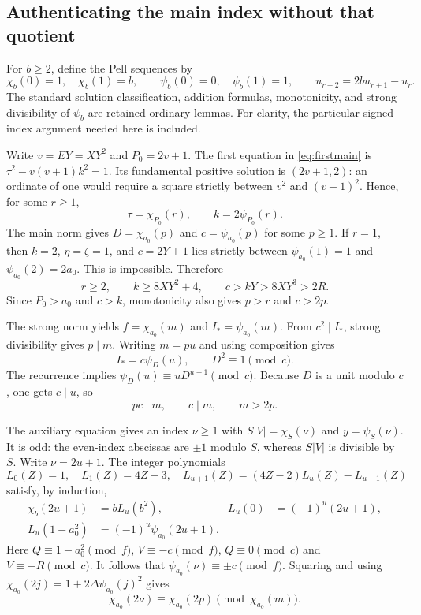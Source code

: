 \documentclass[11pt]{article}
\theoremstyle{remark}\newtheorem{remark}[theorem]{Remark}
\begin{document}
\subsection{Authenticating the main index without that quotient}

For $b\ge2$, define the Pell sequences by
\[
 \chi_b(0)=1,\quad\chi_b(1)=b,\qquad
 \psi_b(0)=0,\quad\psi_b(1)=1,
 \qquad u_{r+2}=2bu_{r+1}-u_r.
\]
The standard solution classification, addition formulas, monotonicity,
and strong divisibility of $\psi_b$ are retained ordinary lemmas.
For clarity, the particular signed-index argument needed here is included.

Write $v=EY=XY^2$ and $P_0=2v+1$. The first equation in
\eqref{eq:firstmain} is $\tau^2-v(v+1)k^2=1$. Its fundamental
positive solution is $(2v+1,2)$: an ordinate of one would require a
square strictly between $v^2$ and $(v+1)^2$. Hence, for some $r\ge1$,
\[
 \tau=\chi_{P_0}(r),\qquad k=2\psi_{P_0}(r).
\]
The main norm gives $D=\chi_{a_0}(p)$ and $c=\psi_{a_0}(p)$ for
some $p\ge1$. If $r=1$, then $k=2$, $\eta=\zeta=1$, and
$c=2Y+1$ lies strictly between $\psi_{a_0}(1)=1$ and
$\psi_{a_0}(2)=2a_0$. This is impossible. Therefore
\begin{equation}\label{eq:largec}
 r\ge2,\qquad k\ge8XY^2+4,\qquad c>kY>8XY^3>2R.
\end{equation}
Since $P_0>a_0$ and $c>k$, monotonicity also gives $p>r$ and $c>2p$.

The strong norm yields $f=\chi_{a_0}(m)$ and $I_*=\psi_{a_0}(m)$.
From $c^2\mid I_*$, strong divisibility gives $p\mid m$. Writing $m=pu$
and using composition gives
\[
 I_*=c\psi_D(u),\qquad D^2\equiv1\pmod c.
\]
The recurrence implies $\psi_D(u)\equiv uD^{u-1}\pmod c$.
Because $D$ is a unit modulo $c$, one gets $c\mid u$, so
\begin{equation}\label{eq:rank}
 pc\mid m,\qquad c\mid m,\qquad m>2p.
\end{equation}

The auxiliary equation gives an index $\nu\ge1$ with
$S|V|=\chi_S(\nu)$ and $y=\psi_S(\nu)$. It is odd: the even-index
abscissas are $\pm1$ modulo $S$, whereas $S|V|$ is divisible by $S$.
Write $\nu=2u+1$. The integer polynomials
\[
 L_0(Z)=1,\quad L_1(Z)=4Z-3,\quad
 L_{u+1}(Z)=(4Z-2)L_u(Z)-L_{u-1}(Z)
\]
satisfy, by induction,
\begin{align*}
 \chi_b(2u+1)&=bL_u(b^2),&L_u(0)&=(-1)^u(2u+1),\\
 L_u(1-a_0^2)&=(-1)^u\psi_{a_0}(2u+1).
\end{align*}
Here $Q\equiv1-a_0^2\pmod f$, $V\equiv-c\pmod f$,
$Q\equiv0\pmod c$ and $V\equiv-R\pmod c$.
It follows that $\psi_{a_0}(\nu)\equiv\pm c\pmod f$.
Squaring and using $\chi_{a_0}(2j)=1+2\Delta\psi_{a_0}(j)^2$ gives
\[
 \chi_{a_0}(2\nu)\equiv\chi_{a_0}(2p)\pmod{\chi_{a_0}(m)}.
\]
\end{document}
